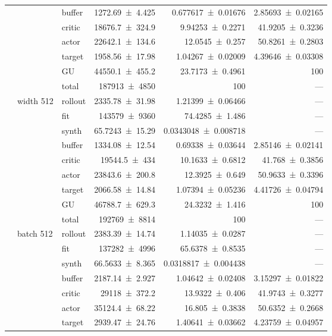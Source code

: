{\begin{longtable}{@{}lllrrr@{}}
     &  & buffer & \num{1272.69+-4.425} & \num{0.677617+-0.01676} & \num{2.85693+-0.02165} \\
     &  & critic & \num{18676.7+-324.9} & \num{9.94253+-0.2271} & \num{41.9205+-0.3236} \\
     &  & actor & \num{22642.1+-134.6} & \num{12.0545+-0.257} & \num{50.8261+-0.2803} \\
     &  & target & \num{1958.56+-17.98} & \num{1.04267+-0.02009} & \num{4.39646+-0.03308} \\
     &  & GU & \num{44550.1+-455.2} & \num{23.7173+-0.4961} & 100 \\
     &  & total & \num{187913+-4850} & \num{100} & --- \\
    \addlinespace[2pt]
     & width 512 & rollout & \num{2335.78+-31.98} & \num{1.21399+-0.06466} & --- \\
     &  & fit & \num{143579+-9360} & \num{74.4285+-1.486} & --- \\
     &  & synth & \num{65.7243+-15.29} & \num{0.0343048+-0.008718} & --- \\
     &  & buffer & \num{1334.08+-12.54} & \num{0.69338+-0.03644} & \num{2.85146+-0.02141} \\
     &  & critic & \num{19544.5+-434} & \num{10.1633+-0.6812} & \num{41.768+-0.3856} \\
     &  & actor & \num{23843.6+-200.8} & \num{12.3925+-0.649} & \num{50.9633+-0.3396} \\
     &  & target & \num{2066.58+-14.84} & \num{1.07394+-0.05236} & \num{4.41726+-0.04794} \\
     &  & GU & \num{46788.7+-629.3} & \num{24.3232+-1.416} & 100 \\
     &  & total & \num{192769+-8814} & \num{100} & --- \\
    \addlinespace[2pt]
     & batch 512 & rollout & \num{2383.39+-14.74} & \num{1.14035+-0.0287} & --- \\
     &  & fit & \num{137282+-4996} & \num{65.6378+-0.8535} & --- \\
     &  & synth & \num{66.5633+-8.365} & \num{0.0318817+-0.004438} & --- \\
     &  & buffer & \num{2187.14+-2.927} & \num{1.04642+-0.02408} & \num{3.15297+-0.01822} \\
     &  & critic & \num{29118+-372.2} & \num{13.9322+-0.406} & \num{41.9743+-0.3277} \\
     &  & actor & \num{35124.4+-68.22} & \num{16.805+-0.3838} & \num{50.6352+-0.2668} \\
     &  & target & \num{2939.47+-24.76} & \num{1.40641+-0.03662} & \num{4.23759+-0.04957} \\

\end{longtable}}
